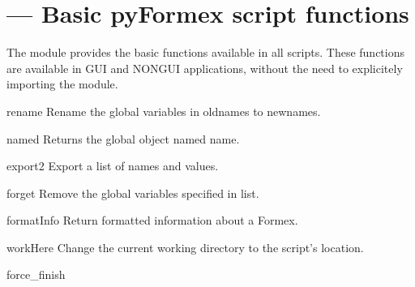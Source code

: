 
\section{ --- Basic pyFormex script functions}
\label{sec:script}


The  module provides the basic functions available
in all \pyformex scripts. These functions are available in GUI and NONGUI
applications, without the need to explicitely importing the 
module.



\begin{funcdesc}{rename}{}
Rename the global variables in oldnames to newnames.

\end{funcdesc}


\begin{funcdesc}{named}{}
Returns the global object named name.

\end{funcdesc}


\begin{funcdesc}{export2}{}
Export a list of names and values.

\end{funcdesc}


\begin{funcdesc}{forget}{}
Remove the global variables specified in list.

\end{funcdesc}


\begin{funcdesc}{formatInfo}{}
Return formatted information about a Formex.

\end{funcdesc}


\begin{funcdesc}{workHere}{}
Change the current working directory to the script's location.

\end{funcdesc}


\begin{funcdesc}{force_finish}{}


\end{funcdesc}


